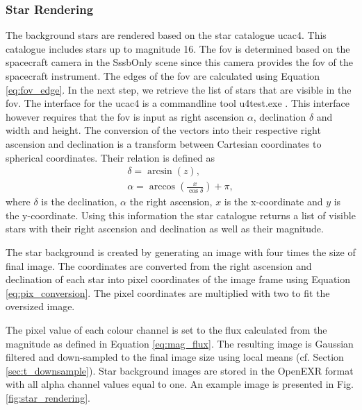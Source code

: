 \subsubsection{Star Rendering} \label{sec:stars}
The background stars are rendered based on the star catalogue \gls{ucac4}. This catalogue includes stars up to magnitude 16. The \gls{fov} is determined based on the spacecraft camera in the SssbOnly scene since this camera provides the \gls{fov} of the spacecraft instrument. The edges of the \gls{fov} are calculated using Equation \ref{eq:fov_edge}. 
In the next step, we retrieve the list of stars that are visible in the \gls{fov}. The interface for the \gls{ucac4} is a commandline tool u4test.exe \cite{gray}. This interface however requires that the \gls{fov} is input as right ascension $\alpha$, declination $\delta$ and width and height.
The conversion of the vectors into their respective right ascension and declination is a transform between Cartesian coordinates to spherical coordinates. Their relation is defined as
\begin{align}
    \delta = \arcsin{(z)}, \label{eq:declination} \\
    \alpha = \arccos{\left(\frac{x}{\cos{\delta}}\right)} + \pi, \label{eq:right_ascension}
\end{align}
where $\delta$ is the declination, $\alpha$ the right ascension, $x$ is the x-coordinate and $y$ is the y-coordinate. Using this information the star catalogue returns a list of visible stars with their right ascension and declination as well as their magnitude.

The star background is created by generating an image with four times the size of final image. The coordinates are converted from the right ascension and declination of each star into pixel coordinates of the image frame using Equation \ref{eq:pix_conversion}. The pixel coordinates are multiplied with two to fit the oversized image.

The pixel value of each colour channel is set to the flux calculated from the magnitude as defined in Equation \ref{eq:mag_flux}. The resulting image is Gaussian filtered and down-sampled to the final image size using local means (cf. Section \ref{sec:t_downsample}). Star background images are stored in the OpenEXR format with all alpha channel values equal to one. An example image is presented in Fig. \ref{fig:star_rendering}.

